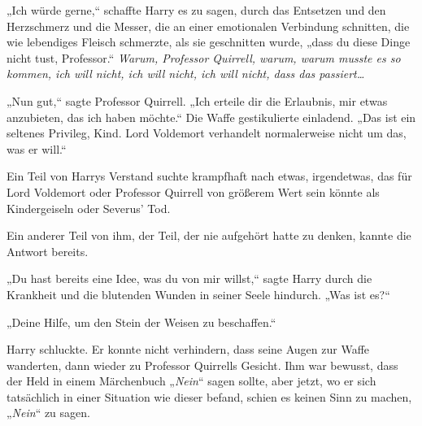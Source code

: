 „Ich würde gerne,“ schaffte Harry es zu sagen, durch das Entsetzen und den Herzschmerz und die Messer, die an einer emotionalen Verbindung schnitten, die wie lebendiges Fleisch schmerzte, als sie geschnitten wurde, „dass du diese Dinge nicht tust, Professor.“
\emph{Warum, Professor Quirrell, warum, warum musste es so kommen, ich will nicht, ich will nicht, ich will nicht, dass das passiert…}

„Nun gut,“ sagte Professor Quirrell. „Ich erteile dir die Erlaubnis, mir etwas anzubieten, das ich haben möchte.“
Die Waffe gestikulierte einladend.
„Das ist ein seltenes Privileg, Kind. Lord Voldemort verhandelt normalerweise nicht um das, was er will.“

Ein Teil von Harrys Verstand suchte krampfhaft nach etwas, irgendetwas, das für Lord Voldemort oder Professor Quirrell von größerem Wert sein könnte als Kindergeiseln oder Severus' Tod.

Ein anderer Teil von ihm, der Teil, der nie aufgehört hatte zu denken, kannte die Antwort bereits.

„Du hast bereits eine Idee, was du von mir willst,“ sagte Harry durch die Krankheit und die blutenden Wunden in seiner Seele hindurch. „Was ist es?“

„Deine Hilfe, um den Stein der Weisen zu beschaffen.“

Harry schluckte. Er konnte nicht verhindern, dass seine Augen zur Waffe wanderten, dann wieder zu Professor Quirrells Gesicht.
Ihm war bewusst, dass der Held in einem Märchenbuch „\emph{Nein}“ sagen sollte, aber jetzt, wo er sich tatsächlich in einer Situation wie dieser befand, schien es keinen Sinn zu machen, „\emph{Nein}“ zu sagen.

